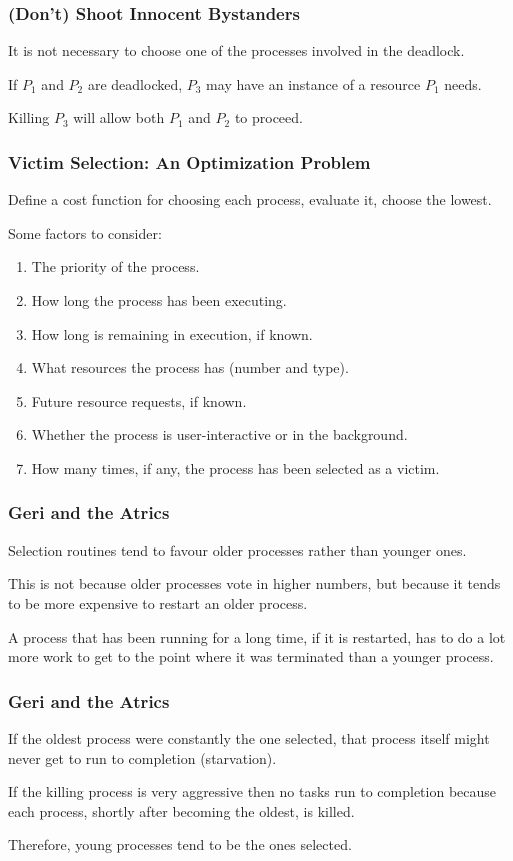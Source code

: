 \begin{frame}
	\frametitle{(Don't) Shoot Innocent Bystanders}

	It is not necessary to choose one of the processes involved in the deadlock.

	If $P_{1}$ and $P_{2}$ are deadlocked, $P_{3}$  may have an instance of a resource $P_{1}$ needs.

	Killing $P_{3}$ will allow both $P_{1}$ and $P_{2}$ to proceed.

\end{frame}

\begin{frame}
	\frametitle{Victim Selection: An Optimization Problem}

	Define a cost function for choosing each process, evaluate it, choose the lowest.

	Some factors to consider:

	\begin{enumerate}
		\item The priority of the process.
		\item How long the process has been executing.
		\item How long is remaining in execution, if known.
		\item What resources the process has (number and type).
		\item Future resource requests, if known.
		\item Whether the process is user-interactive or in the background.
		\item How many times, if any, the process has been selected as a victim.
	\end{enumerate}

\end{frame}

\begin{frame}
	\frametitle{Geri and the Atrics}

	Selection routines tend to favour older processes rather than younger ones.

	This is not because older processes vote in higher numbers, but because it tends to be more expensive to restart an older process.

	A process that has been running for a long time, if it is restarted, has to do a lot more work to get to the point where it was terminated than a younger process.

\end{frame}

\begin{frame}
	\frametitle{Geri and the Atrics}

	If the oldest process were constantly the one selected, that process itself might never get to run to completion (starvation).

	If the killing process is very aggressive then no tasks run to completion because each process, shortly after becoming the oldest, is killed.


	Therefore, young processes tend to be the ones selected.

\end{frame}

